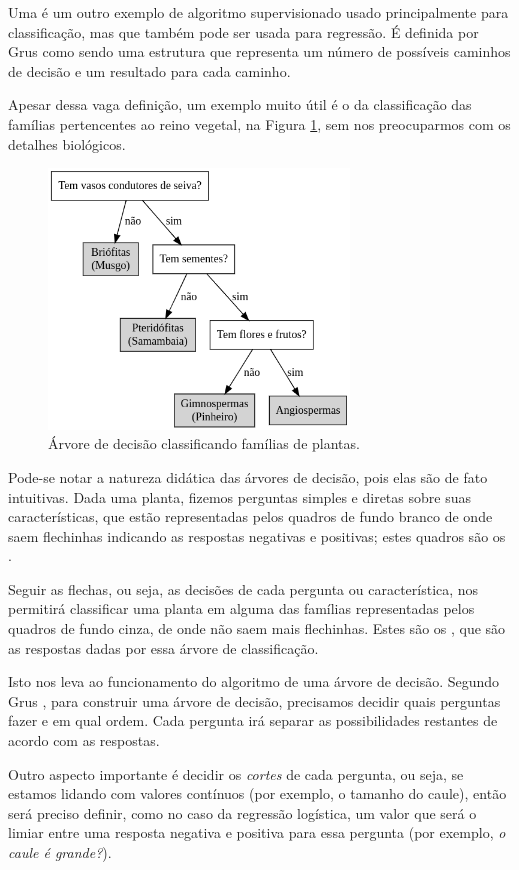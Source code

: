 Uma  é um outro exemplo de algoritmo supervisionado usado principalmente para classificação, mas que também pode ser usada para regressão. É definida por Grus \citep{data} como sendo uma estrutura que representa um número de possíveis caminhos de decisão e um resultado para cada caminho.

Apesar dessa vaga definição, um exemplo muito útil é o da classificação das famílias pertencentes ao reino vegetal, na Figura \ref{fig:plantas}, sem nos preocuparmos com os detalhes biológicos.

\begin{figure}[htb]
\centering
\includegraphics[width=8cm]{figuras/plantas}
\caption{Árvore de decisão classificando famílias de plantas.}
\label{fig:plantas}
\end{figure}

Pode-se notar a natureza didática das árvores de decisão, pois elas são de fato intuitivas. Dada uma planta, fizemos perguntas simples e diretas sobre suas características, que estão representadas pelos quadros de fundo branco de onde saem flechinhas indicando as respostas negativas e positivas; estes quadros são os .

Seguir as flechas, ou seja, as decisões de cada pergunta ou característica, nos permitirá classificar uma planta em alguma das famílias representadas pelos quadros de fundo cinza, de onde não saem mais flechinhas. Estes são os , que são as respostas dadas por essa árvore de classificação.

Isto nos leva ao funcionamento do algoritmo de uma árvore de decisão. Segundo Grus \citep{data}, para construir uma árvore de decisão, precisamos decidir quais perguntas fazer e em qual ordem. Cada pergunta irá separar as possibilidades restantes de acordo com as respostas. 

Outro aspecto importante é decidir os \emph{cortes} de cada pergunta, ou seja, se estamos lidando com valores contínuos (por exemplo, o tamanho do caule), então será preciso definir, como no caso da regressão logística, um valor que será o limiar entre uma resposta negativa e positiva para essa pergunta (por exemplo, \emph{o caule é grande?}).

